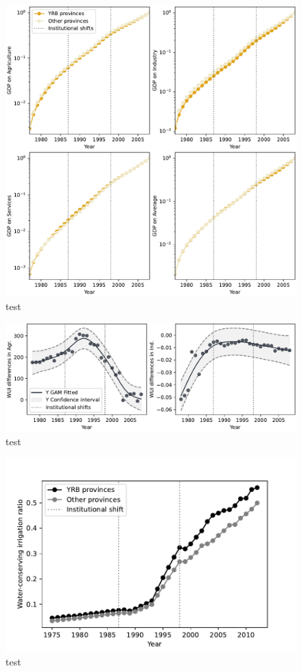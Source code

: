 \graphicspath{{../../../figs/}}

\begin{figure}
    \includegraphics[width=0.7\linewidth]{outputs/economy.pdf}
    \centering
    \caption{test}
    \label{S3-1}
\end{figure}


\begin{figure}
    \includegraphics[width=0.7\linewidth]{outputs/S3_WUI.pdf}
    \centering
    \caption{test}
    \label{S3-2}
\end{figure}


\begin{figure}
    \includegraphics[width=0.7\linewidth]{outputs/S3_wci.pdf}
    \centering
    \caption{test}
    \label{S3-3}
\end{figure}
